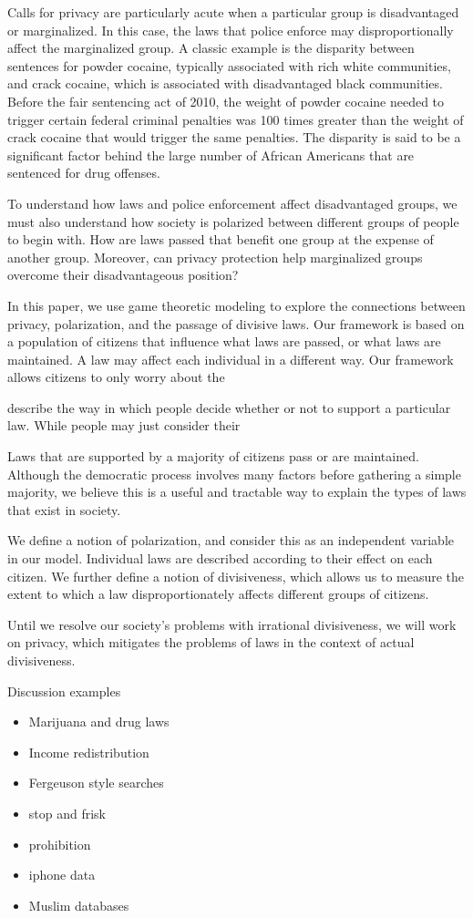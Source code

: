 Calls for privacy are particularly acute when a particular group is disadvantaged or marginalized.  In this case, the laws that police enforce may disproportionally affect the marginalized group.  A classic example is the disparity between sentences for powder cocaine, typically associated with rich white communities, and crack cocaine, which is associated with disadvantaged black communities.  Before the fair sentencing act of 2010, the weight of powder cocaine needed to trigger certain federal criminal penalties was 100 times greater than the weight of crack cocaine that would trigger the same penalties.  The disparity is said to be a significant factor behind the large number of African Americans that are sentenced for drug offenses.

To understand how laws and police enforcement affect disadvantaged groups, we must also understand how society is polarized between different groups of people to begin with.  How are laws passed that benefit one group at the expense of another group.  Moreover, can privacy protection help marginalized groups overcome their disadvantageous position?

In this paper, we use game theoretic modeling to explore the connections between privacy, polarization, and the passage of divisive laws.  Our framework is based on a population of citizens that influence what laws are passed, or what laws are maintained.  A law may affect each individual in a different way.  Our framework allows citizens to only worry about the

describe the way in which people decide whether or not to support a particular law.  While people may just consider their 

Laws that are supported by a majority of citizens pass or are maintained.  Although the democratic process involves many factors before gathering a simple majority, we believe this is a useful and tractable way to explain the types of laws that exist in society.

We define a notion of polarization, and consider this as an independent variable in our model.  Individual laws are described according to their effect on each citizen.  We further define a notion of divisiveness, which allows us to measure the extent to which a law disproportionately affects different groups of citizens.



Until we resolve our society's problems with irrational divisiveness, we will work on privacy, which mitigates the problems of laws in the context of actual divisiveness.

Discussion examples
\begin{itemize}
\item Marijuana and drug laws
\item Income redistribution
\item Fergeuson style searches
\item stop and frisk
\item prohibition
\item iphone data
\item Muslim databases
\end{itemize}